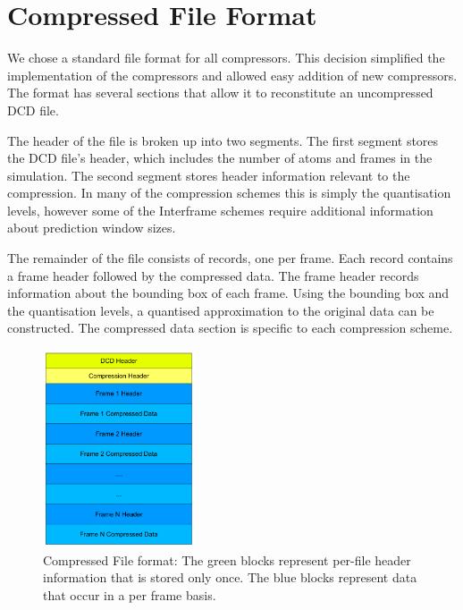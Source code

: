 \documentclass[a4paper,11pt]{report}
\begin{document}

\section{Compressed File Format}

We chose a standard file format for all compressors. This decision simplified the implementation of the compressors and allowed easy addition of new compressors. The format has several sections that allow it to reconstitute an uncompressed DCD file.

The header of the file is broken up into two segments. The first segment stores the DCD file's header, which includes the number of atoms and frames in the simulation. The second segment stores header information relevant to the compression. In many of the compression schemes this is simply the quantisation levels, however some of the Interframe schemes require additional information about prediction window sizes.

The remainder of the file consists of records, one per frame. Each record contains a frame header followed by the compressed data. The frame header records information about the bounding box of each frame. Using the bounding box and the quantisation levels, a quantised approximation to the original data can be constructed. The compressed data section is specific to each compression scheme.

\begin{figure}
 \center
 \includegraphics[width=0.4\textwidth]{resources/FileFormat.png}
\caption{Compressed File format: The green blocks represent per-file header information that is stored only once. The blue blocks represent data that occur in a per frame basis.}
\label{fileformat}
\end{figure}
\end{document}
